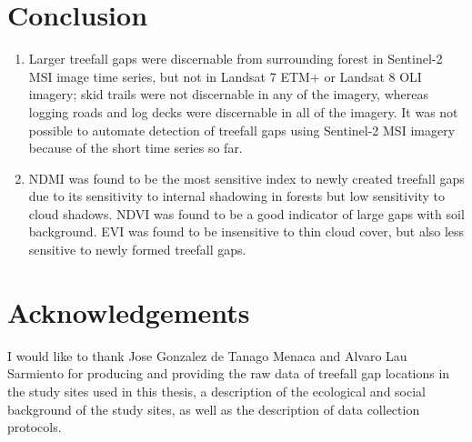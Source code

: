 \documentclass[a4paper,12pt]{scrbook}
\begin{document}
\chapter{Conclusion}

\begin{enumerate}
 \item Larger treefall gaps were discernable from surrounding forest in Sentinel-2 \ac{MSI} image time series, but not in Landsat 7 \ac{ETM+} or Landsat 8 \ac{OLI} imagery; skid trails were not discernable in any of the imagery, whereas logging roads and log decks were discernable in all of the imagery. It was not possible to automate detection of treefall gaps using Sentinel-2 \ac{MSI} imagery because of the short time series so far.
 \item \ac{NDMI} was found to be the most sensitive index to newly created treefall gaps due to its sensitivity to internal shadowing in forests but low sensitivity to cloud shadows. \ac{NDVI} was found to be a good indicator of large gaps with soil background. \ac{EVI} was found to be insensitive to thin cloud cover, but also less sensitive to newly formed treefall gaps.
\end{enumerate}

\chapter{Acknowledgements}

I would like to thank Jose Gonzalez de Tanago Menaca and Alvaro Lau Sarmiento for producing and providing the raw data of treefall gap locations in the study sites used in this thesis, a description of the ecological and social background of the study sites, as well as the description of data collection protocols.

\printnoidxglossary[type=acronym]


\end{document}
